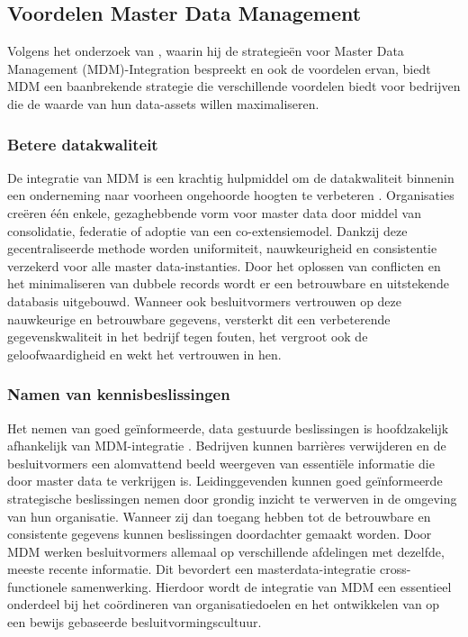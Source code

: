 \subsection{Voordelen Master Data Management}
Volgens het onderzoek van \textcite{Pansara2024}, waarin hij de strategieën voor Master Data Management (MDM)-Integration bespreekt en ook de voordelen ervan, biedt MDM een baanbrekende strategie die verschillende voordelen biedt voor bedrijven die de waarde van hun data-assets willen maximaliseren.

\subsubsection{Betere datakwaliteit}
De integratie van MDM is een krachtig hulpmiddel om de datakwaliteit binnenin een onderneming naar voorheen ongehoorde hoogten te verbeteren \autocite{Pansara2024}. Organisaties creëren één enkele, gezaghebbende vorm voor master data door middel van consolidatie, federatie of adoptie van een co-extensiemodel. Dankzij deze gecentraliseerde methode worden uniformiteit, nauwkeurigheid en consistentie verzekerd voor alle master data-instanties. Door het oplossen van conflicten en het minimaliseren van dubbele records wordt er een betrouwbare en uitstekende databasis uitgebouwd. Wanneer ook besluitvormers vertrouwen op deze nauwkeurige en betrouwbare gegevens, versterkt dit een verbeterende gegevenskwaliteit in het bedrijf tegen fouten, het vergroot ook de geloofwaardigheid en wekt het vertrouwen in hen.

\subsubsection{Namen van kennisbeslissingen}
Het nemen van goed geïnformeerde, data gestuurde beslissingen is hoofdzakelijk afhankelijk van MDM-integratie \autocite{Pansara2024}. Bedrijven kunnen barrières verwijderen en de besluitvormers een alomvattend beeld weergeven van essentiële informatie die door master data te verkrijgen is. Leidinggevenden kunnen goed geïnformeerde strategische beslissingen nemen door grondig inzicht te verwerven in de omgeving van hun organisatie. Wanneer zij dan toegang hebben tot de betrouwbare en consistente gegevens kunnen beslissingen doordachter gemaakt worden. Door MDM werken besluitvormers allemaal op verschillende afdelingen met dezelfde, meeste recente informatie. Dit bevordert een masterdata-integratie cross-functionele samenwerking. Hierdoor wordt de integratie van MDM een essentieel onderdeel bij het coördineren van organisatiedoelen en het ontwikkelen van op een bewijs gebaseerde besluitvormingscultuur.

